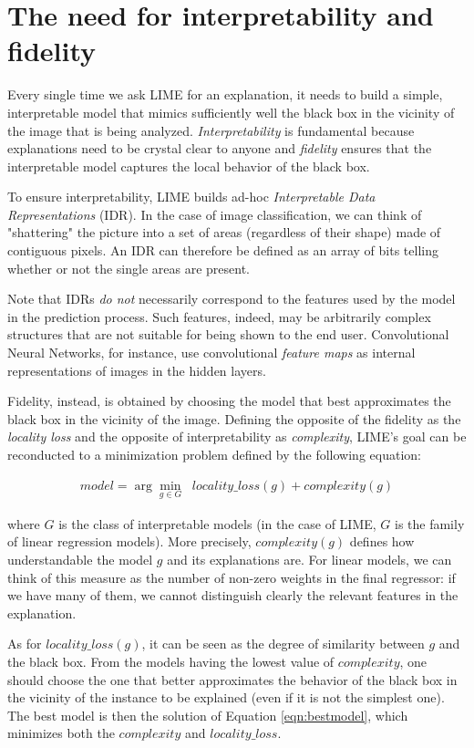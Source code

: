\documentclass[12pt, twoside, a4paper]{report}
\begin{document}
\section{The need for interpretability and fidelity}

Every single time we ask LIME for an explanation, it needs to build a simple, interpretable model that mimics sufficiently well the black box in the vicinity of the image that is being analyzed. 
\textit{Interpretability} is fundamental because explanations need to be crystal clear to anyone and \textit{fidelity} ensures that the interpretable model captures the local behavior of the black box.

To ensure interpretability, LIME builds ad-hoc \textit{Interpretable Data Representations} (IDR). In the case of image classification, we can think of "shattering" the picture into a set of areas (regardless of their shape) made of contiguous pixels. An IDR can therefore be defined as an array of bits telling whether or not the single areas are present.

Note that IDRs \textit{do not} necessarily correspond to the features used by the model in the prediction process. 
Such features, indeed, may be arbitrarily complex structures that are not suitable for being shown to the end user. Convolutional Neural Networks, for instance, use convolutional \textit{feature maps} as internal representations of images in the hidden layers.

Fidelity, instead, is obtained by choosing the model that best approximates the black box in the vicinity of the image. Defining the opposite of the fidelity as the \textit{locality loss} and the opposite of interpretability as \textit{complexity}, LIME's goal can be reconducted to a minimization problem defined by the following equation:

\begin{eqnarray}
model = \arg\min_{g \in G} \;\; locality\_loss(g) + complexity(g)
\label{eqn:bestmodel}
\end{eqnarray}

where $G$ is the class of interpretable models (in the case of LIME, $G$ is the family of linear regression models). More precisely, $complexity(g)$ defines how understandable the model $g$ and its explanations are. For linear models, we can think of this measure as the number of non-zero weights in the final regressor: if we have many of them, we cannot distinguish clearly the relevant features in the explanation.

As for $locality\_loss(g)$, it can be seen as the degree of similarity between $g$ and the black box. From the models having the lowest value of $complexity$, one should choose the one that better approximates the behavior of the black box in the vicinity of the instance to be explained (even if it is not the simplest one). The best model is then the solution of Equation \ref{eqn:bestmodel}, which minimizes both the $complexity$ and $locality\_loss$.
\end{document}
